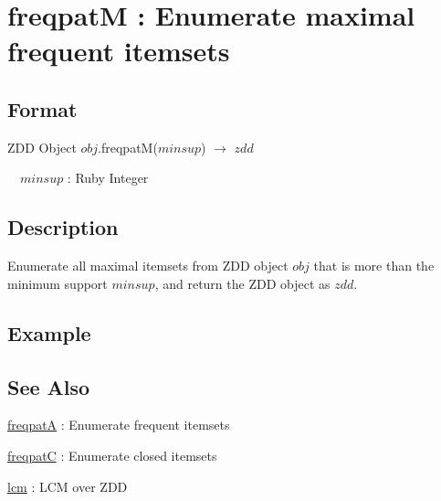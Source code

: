 
\section{freqpatM : Enumerate maximal frequent itemsets\label{sect:freqpatM}}
\subsection*{Format}
ZDD Object $obj$.freqpatM($minsup$) $\rightarrow$ $zdd$

~~$minsup$ : Ruby Integer

\subsection*{Description}
Enumerate all maximal itemsets from ZDD object $obj$ that is more than the minimum support $minsup$, and return the ZDD object as $zdd$. 


\subsection*{Example}


\subsection*{See Also}
\hyperref[sect:freqpatA]{freqpatA} : Enumerate frequent itemsets 

\hyperref[sect:freqpatC]{freqpatC} : Enumerate closed itemsets 

\hyperref[sect:lcm]{lcm} : LCM over ZDD

